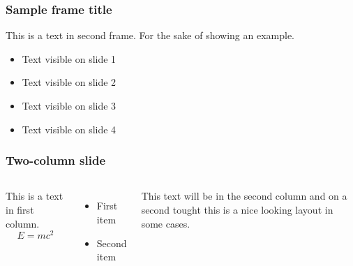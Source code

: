 \documentclass[10pt]{beamer}
\newlength{\wideitemsep}
\let\olditem\item
\renewcommand{\item}{\setlength{\itemsep}{\wideitemsep}\olditem}
\begin{document}
\begin{frame}
\frametitle{Sample frame title}
This is a text in second frame. 
For the sake of showing an example.
 
\begin{itemize}
 \item<1-> Text visible on slide 1
 \item<2-> Text visible on slide 2
 \item<3> Text visible on slide 3
 \item<4-> Text visible on slide 4
\end{itemize}
\end{frame}

\begin{frame}
\frametitle{Two-column slide}
 
\begin{columns}
 
This is a text in first column.
$$E=mc^2$$
\begin{itemize}
\item First item
\item Second item
\end{itemize}
 
This text will be in the second column
and on a second tought this is a nice looking
layout in some cases.
\end{columns}
\end{frame}

{
}

{
}
\end{document}
